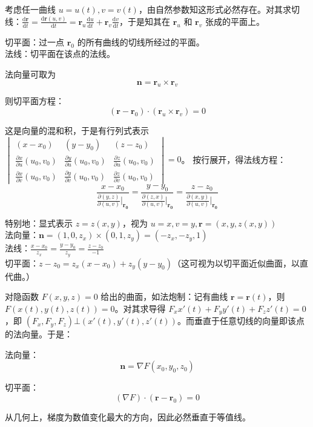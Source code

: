 \documentclass[12pt, a4paper, UTF8, openany]{ctexbook}
\newcommand{\dif}{\mathrm{d}}
\newcommand{\mat}[1]{\mathbf{#1}}
\begin{document}
        考虑任一曲线 $u = u(t), v = v(t)$，由自然参数知这形式必然存在。对其求切线：$\frac{\dif \mat{r}}{\dif t} = \frac{\dif \mat{r}(u, v)}{\dif t} = \mat{r}_u \frac{\dif u}{\dif t} + \mat{r}_v\frac{\dif v}{\dif t}$，于是知其在 $\mat{r}_u$ 和 $\mat{r}_v$ 张成的平面上。

        切平面：过一点 $\mat{r}_0$ 的所有曲线的切线所经过的平面。\\
        法线：切平面在该点的法线。

        法向量可取为
        $$\mat{n} = \mat{r}_u \times \mat{r}_v$$
        
        则切平面方程：
        $$(\mat{r} - \mat{r}_0) \cdot (\mat{r}_u \times \mat{r}_v) = 0$$
        
        这是向量的混和积，于是有行列式表示 $\begin{vmatrix}
            (x - x_0) & (y - y_0) & (z - z_0) \\ 
            \frac{\partial x}{\partial u} (u_0, v_0) & \frac{\partial y}{\partial u} (u_0, v_0) & \frac{\partial z}{\partial u} (u_0, v_0) \\
            \frac{\partial x}{\partial v} (u_0, v_0) & \frac{\partial y}{\partial v} (u_0, v_0) & \frac{\partial z}{\partial v} (u_0, v_0)
        \end{vmatrix} = 0$。
        按行展开，得法线方程：
        $$\dfrac{x - x_0}{\frac{\partial (y, z)}{\partial (u, v)}|_{\mat{r_0}}} = \dfrac{y - y_0}{\frac{\partial (z, x)}{\partial (u, v)}|_{\mat{r_0}}} = \dfrac{z - z_0}{\frac{\partial (x, y)}{\partial (u, v)}|_{\mat{r_0}}}$$

        特别地：显式表示 $z = z(x, y)$，视为 $u = x, v = y, \mat{r} = (x, y, z(x, y))$ \\
        法向量：$\mat{n} = (1, 0, z_x) \times (0, 1, z_y) = (-z_x, -z_y, 1)$ \\
        法线：$\frac{x - x_0}{z_x} = \frac{y - y_0}{z_y} = \frac{z - z_0}{-1}$ \\
        切平面：$z - z_0 = z_x(x - x_0) + z_y(y - y_0)$（这可视为以切平面近似曲面，以直代曲。）

        对隐函数 $F(x, y, z) = 0$ 给出的曲面，如法炮制：记有曲线 $\mat{r} = \mat{r}(t)$，则 $F(x(t), y(t), z(t)) = 0$。对其求导得 $F_x x'(t) + F_y y'(t) + F_z z'(t) = 0$，即 $(F_x, F_y, F_z) \bot (x'(t), y'(t), z'(t))$。而垂直于任意切线的向量即该点的法向量。于是：

        法向量：
        $$\mat{n} = \nabla F (x_0, y_0, z_0)$$

        切平面：
        $$(\nabla F) \cdot (\mat{r} - \mat{r}_0) = 0$$

        从几何上，梯度为数值变化最大的方向，因此必然垂直于等值线。
\end{document}
